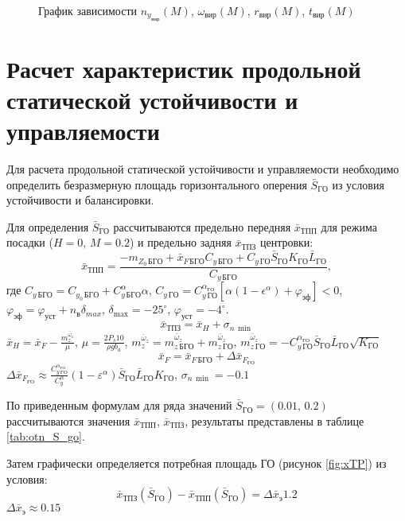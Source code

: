 \begin{figure}[H]
\centering
\resizebox{.79\linewidth}{!}{}
\caption{График зависимости $n_{y_{вир}}(M)$, $\omega_{вир}(M)$, $r_{вир}(M)$, $t_{вир}(M)$}
\label{fig:turn}
\end{figure}

\section{Расчет характеристик продольной статической устойчивости и
управляемости}

Для расчета продольной статической устойчивости и управляемости
необходимо определить безразмерную площадь горизонтального оперения
$\bar{S}_{ГО}$ из условия устойчивости и
балансировки.

Для определения $\bar{S}_{ГО}$ рассчитываются
предельно передняя $\bar{x}_{ТПП}$ для режима
посадки ($H=0,\, M=0.2$) и предельно задняя
$\bar{x}_{ТПЗ}$ центровки:
\begin{equation}
    \bar{x}_{ТПП} = \frac{-m_{Z_0\, БГО} + \bar{x}_{F\, БГО}C_{y\, БГО}+ 
    C_{y\, ГО} \bar{S}_{ГО} K_{ГО} \bar{L}_{ГО}}{C_{y\, БГО}},
\end{equation}
где $C_{y \, БГО} = C_{y_0\,{БГО}} + C_{y\, БГО}^\alpha \alpha$, 
$C_{y\, ГО} = C_{y\, ГО}^{\alpha_{ГО}} \left[ \alpha(1-\epsilon^\alpha) + 
\varphi_{эф}\right] < 0$, $\varphi_{эф} = \varphi_{уст} + n_в \delta_{max}$,
$\delta_{\max} = -25^\circ$, $\varphi_{уст} = -4^\circ$. 
\begin{equation}
    \bar{x}_{ТПЗ} = \bar{x}_{H} + \sigma_{n\, \min}
\end{equation}
$\bar{x}_{H} = \bar{x}_F - \frac{m_z^{\bar{\omega}_z}}{\mu}$, $\mu = \frac{2 P_s 10 }{\rho g b_a}$,
$m_z^{\bar{\omega}_z} = m_{z\, БГО}^{\bar{\omega}_z}+m_{z\, ГО}^{\bar{\omega}_z}$,
$m_{z\, ГО}^{\bar{\omega}_z} = - C_{y\, {ГО}}^{\alpha_{ГО}} \bar{S}_{ГО} \bar{L}_{ГО}
\sqrt{K_{ГО}}$
\begin{equation}
    \bar{x}_F = \bar{x}_{F\, БГО} + \Delta \bar{x}_{F_{ГО}}
\end{equation}
$ \Delta \bar{x}_{F_{ГО}} \approx \frac{C_{y\, ГО}^{\alpha_{ГО}} }{C_{y}^\alpha}
(1-\varepsilon^\alpha)\bar{S}_{ГО} \bar{L}_{ГО}
K_{ГО}$, $\sigma_{n\, \min} = -0.1$

По приведенным формулам для ряда значений
$\bar{S}_{ГО} = (0.01,\, 0.2)$ рассчитываются значения $\bar{x}_{ТПП}$,
$\bar{x}_{ТПЗ}$, результаты представлены в таблице \ref{tab:otn_S_go}. 

Затем графически  определяется потребная площадь ГО (рисунок \ref{fig:xTP}) из условия:
\[
    \bar{x}_{ТПЗ}(\bar{S}_{ГО}) - \bar{x}_{ТПП}(\bar{S}_{ГО}) = \Delta \bar{x}_{э} 1.2 
\]
$\Delta \bar{x}_{э} \approx 0.15$

